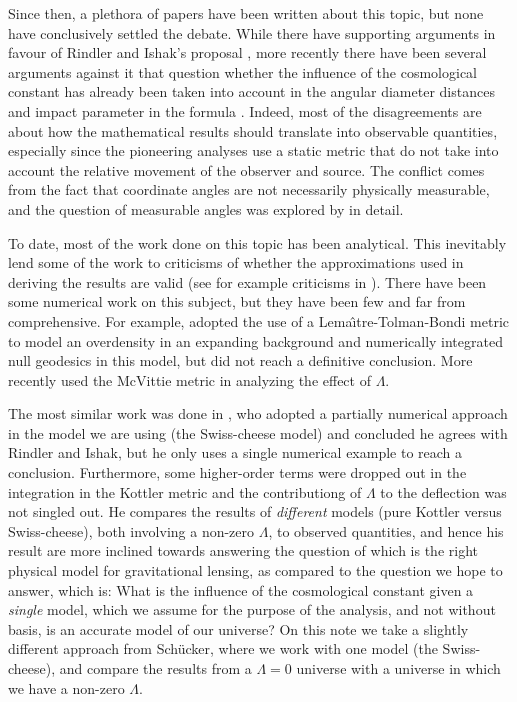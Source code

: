 Since then, a plethora of papers have been written about this topic, but none have conclusively settled the debate. While there have supporting arguments in favour of Rindler and Ishak's proposal \citep{sereno2008influence,bhadra2010gravitational,schucker2008strong}, more recently there have been several arguments against it that question whether the influence of the cosmological constant has already been taken into account in the angular diameter distances and impact parameter in the formula \citep{butcher2016no,piattella2016lensing,arakida2012effect}. Indeed, most of the disagreements are about how the mathematical results should translate into observable quantities, especially since the pioneering analyses use a static metric that do not take into account the relative movement of the observer and source. The conflict comes from the fact that coordinate angles are not necessarily physically measurable, and the question of measurable angles was explored by \citet{lebedev2013influence} in detail. 

To date, most of the work done on this topic has been analytical. This inevitably lend some of the work to criticisms of whether the approximations used in deriving the results are valid (see for example criticisms in \citet{ishak2010more}). There have been some numerical work on this subject, but they have been few and far from comprehensive. For example, \citet{beynon2012testing} adopted the use of a Lema{\^\i}tre-Tolman-Bondi metric to model an overdensity in an expanding background and numerically integrated null geodesics in this model, but did not reach a definitive conclusion. More recently \citep{aghili2017effect} used the McVittie metric \citep{mcvittie1933mass} in analyzing the effect of $\Lambda$. 

The most similar work was done in \citet{schucker2009strong}, who adopted a partially numerical approach in the model we are using (the Swiss-cheese model) and concluded he agrees with Rindler and Ishak, but he only uses a single numerical example to reach a conclusion. Furthermore, some higher-order terms were dropped out in the integration in the Kottler metric and the contributiong of $\Lambda$ to the deflection was not singled out. He compares the results of \emph{different} models (pure Kottler versus Swiss-cheese), both involving a non-zero $\Lambda$, to observed quantities, and hence his result are more inclined towards answering the question of which is the right physical model for gravitational lensing, as compared to the question we hope to answer, which is: What is the influence of the cosmological constant given a \emph{single} model, which we assume for the purpose of the analysis, and not without basis, is an accurate model of our universe? On this note we take a slightly different approach from Sch{\"u}cker, where we work with one model (the Swiss-cheese), and compare the results from a $\Lambda = 0$ universe with a universe in which we have a non-zero $\Lambda$. 

